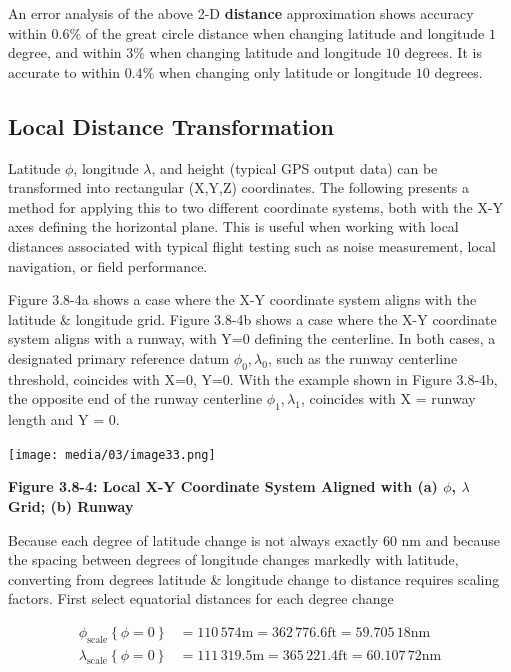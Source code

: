 \documentclass[
]{book}
\begin{document}
An error analysis of the above 2-D \textbf{distance} approximation shows accuracy within \(0.6\%\) of the great circle distance when changing latitude and longitude \(1\) degree, and within \(3\%\) when changing latitude and longitude \(10\) degrees.
It is accurate to within \(0.4\%\) when changing only latitude or longitude \(10\) degrees.

\hypertarget{local-distance-transformation}{%
\subsection*{Local Distance Transformation}\label{local-distance-transformation}}

Latitude \(\phi\), longitude \(\lambda\), and height (typical GPS output data) can be transformed into rectangular (X,Y,Z) coordinates. The following presents a method for applying this to two different coordinate systems, both with the X-Y axes defining the horizontal plane. This is useful when working with local distances associated with typical flight testing such as noise measurement, local navigation, or field performance.

Figure 3.8-4a shows a case where the X-Y coordinate system aligns with the latitude \& longitude grid. Figure 3.8-4b shows a case where the X-Y coordinate system aligns with a runway, with Y=0 defining the centerline. In both cases, a designated primary reference datum \(\phi_0, \lambda_0\), such as the runway centerline threshold, coincides with X=0, Y=0. With the example shown in Figure 3.8-4b, the opposite end of the runway centerline \(\phi_1, \lambda_1\), coincides with X = runway length and Y = 0.

\texttt{[image: media/03/image33.png]}

\textbf{Figure 3.8-4: Local X-Y Coordinate System Aligned with (a) \(\phi\), \(\lambda\) Grid; (b) Runway}

Because each degree of latitude change is not always exactly \(60\) nm and because the spacing between degrees of longitude changes markedly with latitude, converting from degrees latitude \& longitude change to distance requires scaling factors.
First select equatorial distances for each degree change

\[
\begin{align}
\phi_{\mathrm{scale}} \left\{ \phi = 0 \right\} &= 110\,574 \text{m} = 362\,776.6 \text{ft} = 59.705\,18 \text{nm} \\
\lambda_{\mathrm{scale}} \left\{ \phi = 0 \right\} &= 111\,319.5 \text{m} = 365\,221.4 \text{ft} = 60.107\,72 \text{nm} \\
\end{align}
\]
\end{document}

